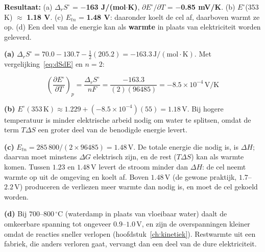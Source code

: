 \begin{oplossing}
\textbf{Resultaat:} (a) \(\Delta_r S^\circ\) = \textbf{\ensuremath{-}163 J/(mol\ensuremath{\cdot{}}K)}, \(\partial E^\circ/\partial T\) = \textbf{\ensuremath{-}0.85 mV/K}. (b) \(E^\circ\)(353 K) \ensuremath{\approx{}} \textbf{1.18 V}. (c) \(E_{tn}\) = \textbf{1.48 V}: daaronder koelt de cel af, daarboven warmt ze op. (d) Een deel van de energie kan als \textbf{warmte} in plaats van elektriciteit worden geleverd.

\textbf{(a)} \(\Delta_r S^\circ = 70.0 - 130.7 - \tfrac{1}{2}(205.2) = -163.3\,\mathrm{J/(mol\cdot K)}\). Met vergelijking~\eqref{eq:dSdE} en \(n = 2\):

\[
\left(\frac{\partial E^\circ}{\partial T}\right)_p = \frac{\Delta_r S^\circ}{nF} = \frac{-163.3}{(2)(96485)} = -8.5\times10^{-4}\,\mathrm{V/K}
\]

\textbf{(b)} \(E^\circ(353\,\mathrm{K}) \approx 1.229 + (-8.5\times10^{-4})(55) = 1.18\,\mathrm{V}\). Bij hogere temperatuur is minder elektrische arbeid nodig om water te splitsen, omdat de term \(T\Delta S\) een groter deel van de benodigde energie levert.

\textbf{(c)} \(E_{tn} = 285\,800/(2 \times 96485) = 1.48\,\mathrm{V}\). De totale energie die nodig is, is \(\Delta H\); daarvan moet minstens \(\Delta G\) elektrisch zijn, en de rest (\(T\Delta S\)) kan als warmte komen. Tussen \(1.23\) en \(1.48\,\mathrm{V}\) levert de stroom minder dan \(\Delta H\): de cel neemt warmte op uit de omgeving en koelt af. Boven \(1.48\,\mathrm{V}\) (de gewone praktijk, \(1.7\)--\(2.2\,\mathrm{V}\)) produceren de verliezen meer warmte dan nodig is, en moet de cel gekoeld worden.

\textbf{(d)} Bij \(700\)--\(800\,^\circ\mathrm{C}\) (waterdamp in plaats van vloeibaar water) daalt de omkeerbare spanning tot ongeveer \(0.9\)--\(1.0\,\mathrm{V}\), en zijn de overspanningen kleiner omdat de reacties sneller verlopen (hoofdstuk~\ref{ch:kinetiek}). Restwarmte uit een fabriek, die anders verloren gaat, vervangt dan een deel van de dure elektriciteit.
\end{oplossing}

